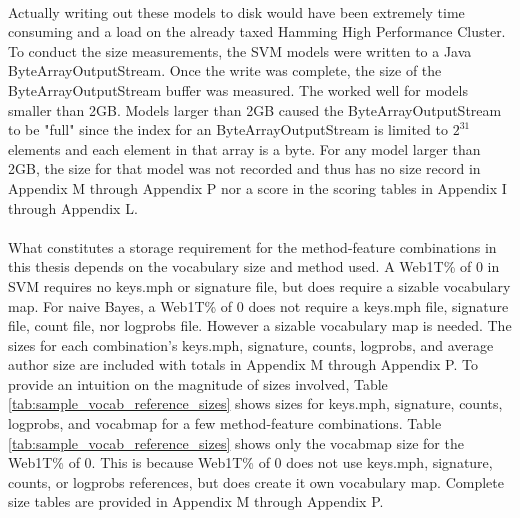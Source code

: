 	\paragraph*{} Actually writing out these models to disk would have been extremely time consuming and a load on the already taxed Hamming High Performance Cluster.  To conduct the size measurements, the SVM models were written to a Java ByteArrayOutputStream.  Once the write was complete, the size of the ByteArrayOutputStream buffer was measured.  The worked well for models smaller than 2GB.  Models larger than 2GB caused the ByteArrayOutputStream to be "full" since the index for an ByteArrayOutputStream is limited to $2^{31}$ elements and each element in that array is a byte.  For any model larger than 2GB, the size for that model was not recorded and thus has no size record in Appendix M through Appendix P nor a score in the scoring tables in Appendix I through Appendix L.
	\paragraph*{} What constitutes a storage requirement for the method-feature combinations in this thesis depends on the vocabulary size and method used.  A Web1T\% of 0 in SVM requires no keys.mph or signature file, but does require a sizable vocabulary map.  For naive Bayes, a Web1T\% of 0 does not require a keys.mph file, signature file, count file, nor logprobs file.  However a sizable vocabulary map is needed.  The sizes for each combination's keys.mph, signature, counts, logprobs, and average author size are included with totals in Appendix M through Appendix P.  To provide an intuition on the magnitude of sizes involved, Table \ref{tab:sample_vocab_reference_sizes} shows sizes for keys.mph, signature, counts, logprobs, and vocabmap for a few method-feature combinations.  Table \ref{tab:sample_vocab_reference_sizes} shows only the vocabmap size for the Web1T\% of 0.  This is because Web1T\% of 0 does not use keys.mph, signature, counts, or logprobs references, but does create it own vocabulary map.  Complete size tables are provided in Appendix M through Appendix P.
	
